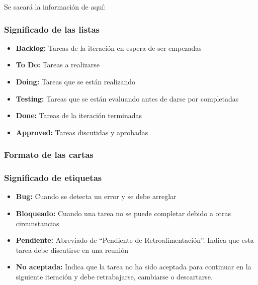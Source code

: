
Se sacará la información de aquí: \cite{Brechner2015-dv} %
\subsubsection{Significado de las listas}

\begin{itemize}
    \item \textbf{Backlog:} Tareas de la iteración en espera de ser empezadas
    \item \textbf{To Do:} Tareas a realizarse
    \item \textbf{Doing:} Tareas que se están realizando
    \item \textbf{Testing:} Tareas que se están evaluando antes de darse por completadas
    \item \textbf{Done:} Tareas de la iteración terminadas
    \item \textbf{Approved:} Tareas discutidas y aprobadas
\end{itemize}

\subsubsection{Formato de las cartas}




\subsubsection{Significado de etiquetas}
\begin{itemize}
    \item \textbf{Bug:} Cuando se detecta un error y se debe arreglar
    \item \textbf{Bloqueado:} Cuando una tarea no se puede completar debido a
    otras circunstancias
    \item \textbf{Pendiente:} Abreviado de “Pendiente de Retroalimentación”.
    Indica que esta tarea debe discutirse en una reunión
    \item \textbf{No aceptada:} Indica que la tarea no ha sido aceptada para
    continuar en la siguiente iteración y debe retrabajarse, cambiarse o
    descartarse.
\end{itemize}

